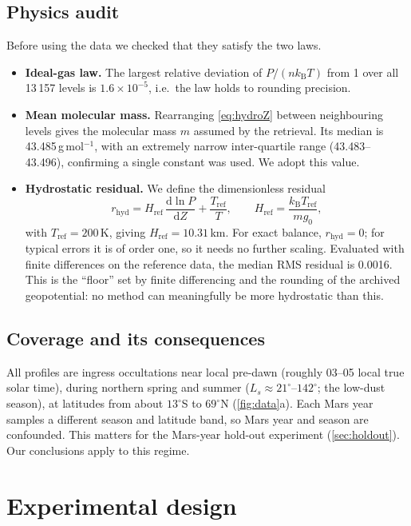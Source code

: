 \documentclass[11pt,a4paper]{article}
\newcommand{\dd}{\mathrm{d}}
\newcommand{\kB}{k_{\mathrm{B}}}
\newcommand{\Href}{H_{\mathrm{ref}}}
\newcommand{\Tref}{T_{\mathrm{ref}}}
\newcommand{\rhyd}{r_{\mathrm{hyd}}}
\begin{document}
\subsection{Physics audit}\label{sec:audit}
Before using the data we checked that they satisfy the two laws.
\begin{itemize}[leftmargin=*]
\item \textbf{Ideal-gas law.} The largest relative deviation of $P/(n\kB T)$ from 1 over all 13\,157 levels is $1.6\times10^{-5}$, i.e.\ the law holds to rounding precision.
\item \textbf{Mean molecular mass.} Rearranging \cref{eq:hydroZ} between neighbouring levels gives the molecular mass $m$ assumed by the retrieval. Its median is 43.485\,g\,mol$^{-1}$, with an extremely narrow inter-quartile range (43.483--43.496), confirming a single constant was used. We adopt this value.
\item \textbf{Hydrostatic residual.} We define the dimensionless residual
\begin{equation}
\rhyd = \Href\,\frac{\dd\ln P}{\dd Z} + \frac{\Tref}{T},\qquad \Href=\frac{\kB\Tref}{m g_0}, \label{eq:rhyd}
\end{equation}
with $\Tref=200$\,K, giving $\Href=10.31$\,km. For exact balance, $\rhyd=0$; for typical errors it is of order one, so it needs no further scaling. Evaluated with finite differences on the reference data, the median RMS residual is 0.0016. This is the ``floor'' set by finite differencing and the rounding of the archived geopotential: no method can meaningfully be more hydrostatic than this.
\end{itemize}

\subsection{Coverage and its consequences}
All profiles are ingress occultations near local pre-dawn (roughly 03--05 local true solar time), during northern spring and summer ($L_s\approx21^\circ$--$142^\circ$; the low-dust season), at latitudes from about $13^\circ$S to $69^\circ$N (\cref{fig:data}a). Each Mars year samples a different season and latitude band, so Mars year and season are confounded. This matters for the Mars-year hold-out experiment (\cref{sec:holdout}). Our conclusions apply to this regime.

\section{Experimental design}\label{sec:design}
\end{document}
